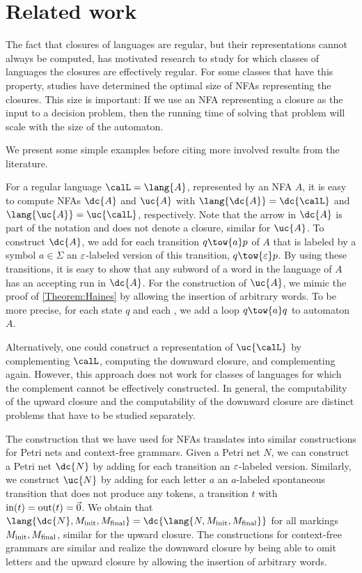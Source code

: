 \documentclass[../../diss.tex]{subfiles}
\begin{document}
\section{Related work}%
\label{Section:PNRelwork}%

The fact that closures of languages are regular, but their representations cannot always be computed, has motivated research to study for which classes of languages the closures are effectively regular.
For some classes that have this property, studies have determined the optimal size of NFAs representing the closures.
This size is important:
If we use an NFA representing a closure as the input to a decision problem, then the running time of solving that problem will scale with the size of the automaton.

We present some simple examples before citing more involved results from the literature.

For a regular language $\calL = \lang{A}$, represented by an NFA $A$, it is easy to compute NFAs $\dc{A}$ and $\uc{A}$ with $\lang{\dc{A}} = \dc{\calL}$ and $\lang{\uc{A}} = \uc{\calL}$, respectively.
Note that the arrow in $\dc{A}$ is part of the notation and does not denote a closure, similar for $\uc{A}$.
To construct $\dc{A}$, we add for each transition $q \tow{a} p$ of $A$ that is labeled by a symbol $a \in \Sigma$ an $\varepsilon$-labeled version of this transition, $q \tow{\eps} p$.
By using these transitions, it is easy to show that any subword of a word in the language of $A$ has an accepting run in $\dc{A}$.
For the construction of $\uc{A}$, we mimic the proof of \cref{Theorem:Haines} by allowing the insertion of arbitrary words.
To be more precise, for each state $q$ and each , we add a loop $q \tow{a} q$ to automaton $A$.

Alternatively, one could construct a representation of $\uc{\calL}$ by complementing $\calL$, computing the downward closure, and complementing again.
However, this approach does not work for classes of languages for which the complement cannot be effectively constructed.
In general, the computability of the upward closure and the computability of the downward closure are distinct problems that have to be studied separately.

The construction that we have used for NFAs translates into similar constructions for Petri nets and context-free grammars.
Given a Petri net $N$, we can construct a Petri net $\dc{N}$ by adding for each transition an $\varepsilon$-labeled version.
Similarly, we construct $\uc{N}$ by adding for each letter $a$ an $a$-labeled spontaneous transition that does not produce any tokens, \ie a transition $t$ with $\text{in}(t) = \text{out}(t) = \vec{0}$.
We obtain that $\lang{\dc{N},\Minit,\Mfinal} = \dc{\lang{N,\Minit,\Mfinal}}$ for all markings $M_{\text{init}}, M_{\text{final}}$, similar for the upward closure.
The constructions for context-free grammars are similar and realize the downward closure by being able to omit letters and the upward closure by allowing the insertion of arbitrary words.
\end{document}
